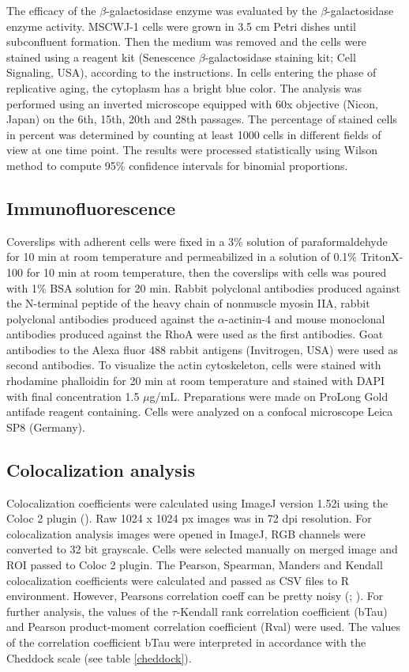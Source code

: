 \documentclass[english,authoryear]{elsarticle}
\begin{document}
The efficacy of the $\beta$-galactosidase enzyme was evaluated by the $\beta$-galactosidase enzyme activity.
MSCWJ-1 cells were grown in 3.5 cm Petri dishes until subconfluent formation.
Then the medium was removed and the cells were stained using a reagent kit (Senescence $\beta$-galactosidase staining kit; Cell Signaling, USA), according to the instructions.
In cells entering the phase of replicative aging, the cytoplasm has a bright blue color.
The analysis was performed using an inverted microscope equipped with 60x objective (Nicon, Japan) on the 6th, 15th, 20th and 28th passages.
The percentage of stained cells in percent was determined by counting at least 1000 cells in different fields of view at one time point.
The results were processed statistically using Wilson method to compute 95\% confidence intervals for binomial proportions.

\subsection{Immunofluorescence}

Coverslips with adherent cells were fixed in a 3\% solution of paraformaldehyde for 10 min at room temperature and permeabilized in a solution of 0.1\% TritonX-100 for 10 min at room temperature, then the coverslips with cells was poured with 1\% BSA solution for 20 min.
Rabbit polyclonal antibodies produced against the N-terminal peptide of the heavy chain of nonmuscle myosin IIA, rabbit polyclonal antibodies produced against the $\alpha$-actinin-4 and mouse monoclonal antibodies produced against the RhoA were used as the first antibodies.
Goat antibodies to the Alexa fluor 488 rabbit antigens (Invitrogen, USA) were used as second antibodies.
To visualize the actin cytoskeleton, cells were stained with rhodamine phalloidin for 20 min at room temperature and stained with DAPI with final concentration 1.5 $\mu$g/mL.
Preparations were made on ProLong Gold antifade reagent containing.
Cells were analyzed on a confocal microscope Leica SP8 (Germany).


\subsection{Colocalization analysis}

Colocalization coefficients were calculated using ImageJ version 1.52i using the Coloc 2 plugin (\cite{rueden2017imagej2}).
Raw 1024 x 1024 px images was in 72 dpi resolution.
For colocalization analysis images were opened in ImageJ, RGB channels were converted to 32 bit grayscale.
Cells were selected manually on merged image and ROI passed to Coloc 2 plugin.
The Pearson, Spearman, Manders and Kendall colocalization coefficients were calculated and passed as CSV files to R environment.
However, Pearsons correlation coeff can be pretty noisy (\cite{adler2008replicate}; \cite{bergholm2010analysis}).
For further analysis, the values of the $\tau$-Kendall rank correlation coefficient (bTau) and Pearson product-moment correlation coefficient (Rval) were used.
The values of the correlation coefficient bTau were interpreted in accordance with the Cheddock scale (see table \ref{cheddock}).
\end{document}
